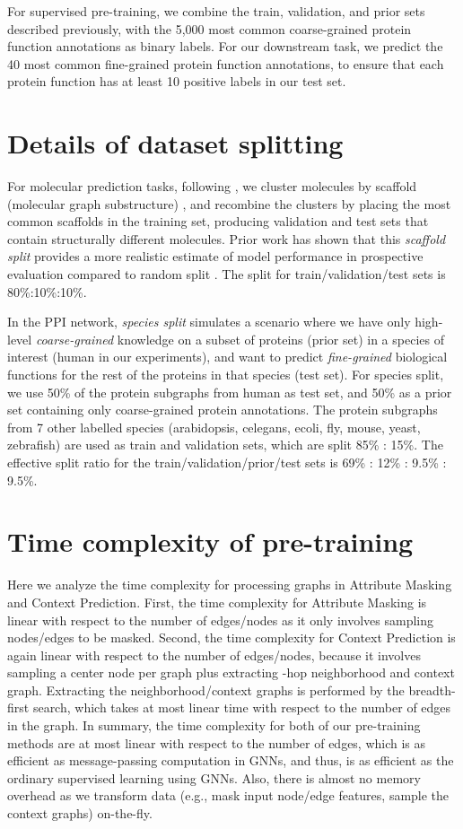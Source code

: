\documentclass{article} \usepackage{iclr2020_conference,times}
\numberwithin{equation}{section}
\theoremstyle{plain}
\theoremstyle{definition}
\theoremstyle{remark}
\begin{document}
For supervised pre-training, we combine the train, validation, and prior sets described previously, with the 5,000 most common coarse-grained protein function annotations as binary labels. For our downstream task, we predict the 40 most common fine-grained protein function annotations, to ensure that each protein function has at least 10 positive labels in our test set.


\section{Details of dataset splitting}
\label{sec:data_splitting}
For molecular prediction tasks, following \citet{Ramsundar-et-al-2019}, we cluster molecules by scaffold (molecular graph substructure) \citep{bemis1996}, and recombine the clusters by placing the most common scaffolds in the training set, producing validation and test sets that contain structurally different molecules. Prior work has shown that this \emph{scaffold split} provides a more realistic estimate of model performance in prospective evaluation compared to random split \citep{chen2012,sheridan2013}. The split  for train/validation/test sets is 80\%:10\%:10\%. 

In the PPI network, \emph{species split} simulates a scenario where we have only high-level \emph{coarse-grained} knowledge on a subset of proteins (prior set) in a species of interest (human in our experiments), and want to predict \emph{fine-grained} biological functions for the rest of the proteins in that species (test set). For species split, we use 50\% of the protein subgraphs from human as test set, and 50\% as a prior set containing only coarse-grained protein annotations. The protein subgraphs from 7 other labelled species (arabidopsis, celegans, ecoli, fly, mouse, yeast, zebrafish) are used as train and validation sets, which are split 85\% : 15\%. The effective split ratio for the train/validation/prior/test sets is 69\% : 12\% : 9.5\% : 9.5\%. 

\section{Time complexity of pre-training}
\label{app:complexity}
Here we analyze the time complexity for processing graphs in Attribute Masking and Context Prediction.
First, the time complexity for Attribute Masking is linear with respect to the number of edges/nodes as it only involves sampling nodes/edges to be masked.
Second, the time complexity for Context Prediction is again linear with respect to the number of edges/nodes, because it involves sampling a center node per graph plus extracting -hop neighborhood and context graph. Extracting the neighborhood/context graphs is performed by the breadth-first search, which takes at most linear time with respect to the number of edges in the graph. 
In summary, the time complexity for both of our pre-training methods are at most linear with respect to the number of edges, which is as efficient as message-passing computation in GNNs, and thus, is as efficient as the ordinary supervised learning using GNNs. Also, there is almost no memory overhead as we transform data (e.g., mask input node/edge features, sample the context graphs) on-the-fly.
\end{document}
